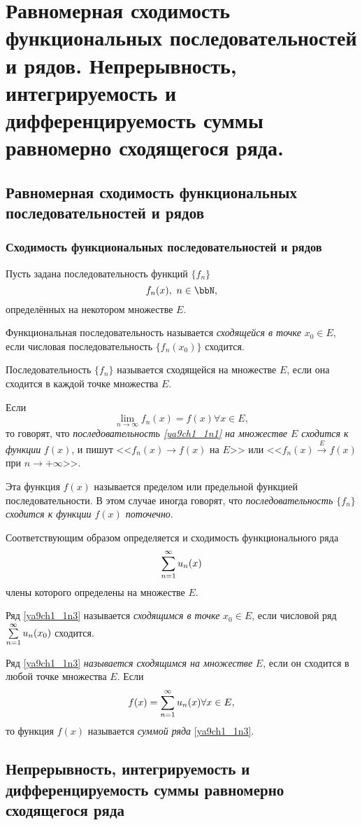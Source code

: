 \chapter{Равномерная сходимость функциональных последовательностей и рядов. Непрерывность, интегрируемость и дифференцируемость суммы равномерно сходящегося ряда.}

\section{Равномерная сходимость функциональных последовательностей и рядов}

\subsection{Сходимость функциональных последовательностей и рядов}

Пусть задана последовательность функций $\{f_n\}$
\begin{equation} \label{ya9ch1_1n1}
f_n(x),\ n\in \bbN, 
\end{equation}
определённых на некотором множестве $E$.
\begin{defn} Функциональная последовательность называется \textit{сходящейся в точке} $x_0 \in E$, если числовая последовательность $\{f_n(x_0)\}$ сходится.

Последовательность $\{f_n\}$ называется сходящейся на множестве $E$, если она сходится в каждой точке множества $E$.

Если
\begin{equation} \label{ya9ch1_1n2}
\lim_{n \to \infty} f_n(x) = f(x) \forall x\in E,
\end{equation}
то говорят, что \textit{последовательность \eqref{ya9ch1_1n1} на множестве $E$ сходится к функции} $f(x)$, и пишут <<$f_n(x)\to f(x)$ на $E$>> или <<$f_n(x) \xrightarrow{E} f(x)$ при $n \to +\infty $>>.

Эта функция $f(x)$ называется пределом или предельной функцией последовательности. В этом случае иногда говорят, что \textit{последовательность $\{f_n\}$ сходится к функции $f(x)$ поточечно}.
\end{defn}

Соответствующим образом определяется и сходимость функционального ряда
\begin{equation} \label{ya9ch1_1n3}
\sum_{n=1}^{\infty}\limits u_n(x)
\end{equation}
члены которого определены на множестве $E$.
\begin{defn} Ряд \eqref{ya9ch1_1n3} называется \textit{сходящимся в точке} $x_0 \in E$, если числовой ряд $\sum_{n=1}^{\infty}\limits u_n(x_0)$ сходится.

Ряд \eqref{ya9ch1_1n3} \textit{называется сходящимся на множестве} $E$, если он сходится в любой точке множества $E$. Если
\begin{equation} \label{ya9ch1_1n4}
f(x)=\sum_{n=1}^{\infty}\limits u_n(x) \forall x \in E,
\end{equation}
то функция $f(x)$ называется \textit{суммой ряда} \eqref{ya9ch1_1n3}.
\end{defn}

\section{Непрерывность, интегрируемость и дифференцируемость суммы равномерно сходящегося ряда}